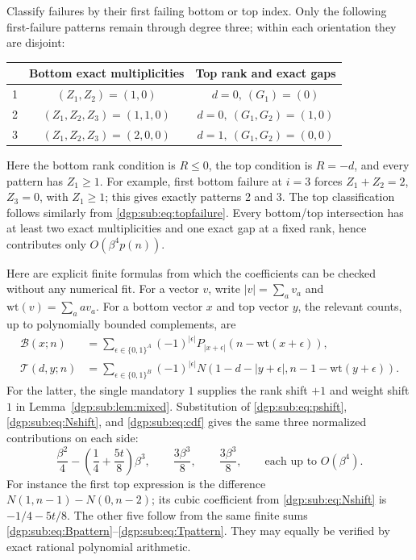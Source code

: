 \documentclass[11pt,letterpaper]{article}
\numberwithin{equation}{section}
\theoremstyle{remark}\newtheorem{remark}[theorem]{Remark}
\begin{document}
Classify failures by their first failing bottom or top index. Only
the following first-failure patterns remain through degree three;
within each orientation they are disjoint:
\begin{center}
\begin{tabular}{c c c}
\toprule
& Bottom exact multiplicities & Top rank and exact gaps\\
\midrule
1 & $(Z_1,Z_2)=(1,0)$ & $d=0,\ (G_1)=(0)$\\
2 & $(Z_1,Z_2,Z_3)=(1,1,0)$ & $d=0,\ (G_1,G_2)=(1,0)$\\
3 & $(Z_1,Z_2,Z_3)=(2,0,0)$ & $d=1,\ (G_1,G_2)=(0,0)$\\
\bottomrule
\end{tabular}
\end{center}
Here the bottom rank condition is $R\leq0$, the top condition is
$R=-d$, and every pattern has $Z_1\geq1$. For example, first bottom
failure at $i=3$ forces $Z_1+Z_2=2$, $Z_3=0$, with $Z_1\geq1$;
this gives exactly patterns 2 and 3. The top classification follows
similarly from \eqref{dgp:sub:eq:topfailure}. Every bottom/top intersection
has at least two exact multiplicities and one exact gap at a fixed
rank, hence contributes only $O(\beta^4p(n))$.

Here are explicit finite formulas from which the coefficients can
be checked without any numerical fit. For a vector $v$, write
$|v|=\sum_a v_a$ and $\mathrm{wt}(v)=\sum_a av_a$.
For a bottom vector $x$ and top vector $y$, the relevant counts,
up to polynomially bounded complements, are
\begin{align}
 \mathcal B(x;n)&=\sum_{\epsilon\in\{0,1\}^{A}}(-1)^{|\epsilon|}
  P_{|x+\epsilon|}(n-\mathrm{wt}(x+\epsilon)),\label{dgp:sub:eq:Bpattern}\\
 \mathcal T(d,y;n)&=\sum_{\epsilon\in\{0,1\}^{B}}(-1)^{|\epsilon|}
  N(1-d-|y+\epsilon|,n-1-\mathrm{wt}(y+\epsilon)).\label{dgp:sub:eq:Tpattern}
\end{align}
For the latter, the single mandatory $1$ supplies the rank shift
$+1$ and weight shift $1$ in Lemma~\ref{dgp:sub:lem:mixed}.
Substitution of \eqref{dgp:sub:eq:pshift}, \eqref{dgp:sub:eq:Nshift}, and
\eqref{dgp:sub:eq:cdf} gives the same three normalized contributions on
each side:
\begin{equation}\label{dgp:sub:eq:three}
 \frac{\beta^2}4-\left(\frac14+\frac{5t}8\right)\beta^3,
 \qquad\frac{3\beta^3}8,
 \qquad\frac{3\beta^3}8,
 \qquad\text{each up to }O(\beta^4).
\end{equation}
For instance the first top expression is the difference
$N(1,n-1)-N(0,n-2)$; its cubic coefficient from
\eqref{dgp:sub:eq:Nshift} is $-1/4-5t/8$. The other five follow from the
same finite sums \eqref{dgp:sub:eq:Bpattern}--\eqref{dgp:sub:eq:Tpattern}.
They may equally be verified by exact rational polynomial arithmetic.
\end{document}
